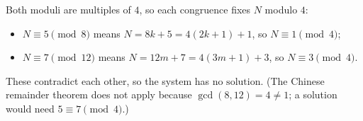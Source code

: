 Both moduli are multiples of $4$, so each congruence fixes $N$ modulo $4$:
\begin{itemize}
\item $N\equiv5\pmod8$ means $N=8k+5=4(2k+1)+1$, so $N\equiv1\pmod4$;
\item $N\equiv7\pmod{12}$ means $N=12m+7=4(3m+1)+3$, so $N\equiv3\pmod4$.
\end{itemize}
These contradict each other, so the system has $\boxed{\text{no solution}}$. (The Chinese remainder theorem does not apply because $\gcd(8,12)=4\ne1$; a solution would need $5\equiv7\pmod4$.)
